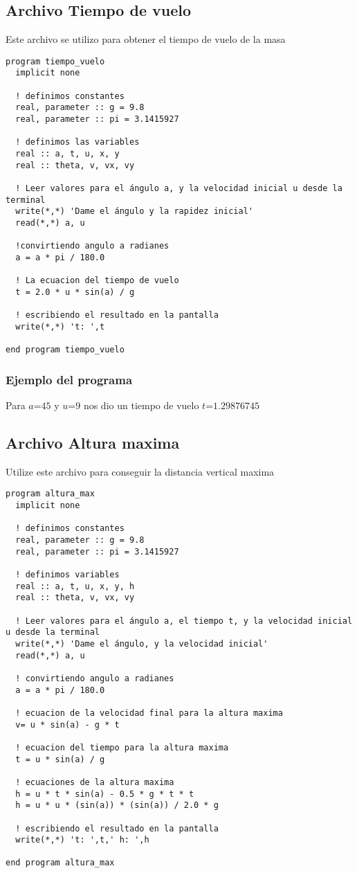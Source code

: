 \documentclass{article}
\begin{document}
\subsection{Archivo Tiempo de vuelo}
Este archivo se utilizo para obtener el tiempo de vuelo de la masa
\begin{verbatim}
program tiempo_vuelo
  implicit none

  ! definimos constantes
  real, parameter :: g = 9.8
  real, parameter :: pi = 3.1415927

  ! definimos las variables
  real :: a, t, u, x, y
  real :: theta, v, vx, vy

  ! Leer valores para el ángulo a, y la velocidad inicial u desde la terminal
  write(*,*) 'Dame el ángulo y la rapidez inicial'
  read(*,*) a, u

  !convirtiendo angulo a radianes
  a = a * pi / 180.0

  ! La ecuacion del tiempo de vuelo
  t = 2.0 * u * sin(a) / g

  ! escribiendo el resultado en la pantalla
  write(*,*) 't: ',t

end program tiempo_vuelo
\end{verbatim}
\subsubsection{Ejemplo del programa}
Para $a$=$45$ y $u$=$9$ nos dio un tiempo de vuelo $t$=$1.29876745$
\subsection{Archivo Altura maxima}
Utilize este archivo para conseguir la distancia vertical maxima
\begin{verbatim}
program altura_max
  implicit none

  ! definimos constantes
  real, parameter :: g = 9.8
  real, parameter :: pi = 3.1415927

  ! definimos variables
  real :: a, t, u, x, y, h
  real :: theta, v, vx, vy

  ! Leer valores para el ángulo a, el tiempo t, y la velocidad inicial u desde la terminal
  write(*,*) 'Dame el ángulo, y la velocidad inicial'
  read(*,*) a, u

  ! convirtiendo angulo a radianes
  a = a * pi / 180.0

  ! ecuacion de la velocidad final para la altura maxima
  v= u * sin(a) - g * t

  ! ecuacion del tiempo para la altura maxima
  t = u * sin(a) / g

  ! ecuaciones de la altura maxima
  h = u * t * sin(a) - 0.5 * g * t * t
  h = u * u * (sin(a)) * (sin(a)) / 2.0 * g

  ! escribiendo el resultado en la pantalla
  write(*,*) 't: ',t,' h: ',h

end program altura_max
\end{verbatim}
\end{document}
